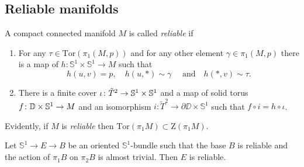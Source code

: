 \documentclass{amsart}
\begin{document}
\subsection{Reliable manifolds}

\begin{defn}
A compact connected manifold $M$ is called \emph{reliable} if 
\begin{enumerate}
\item \label{reliable1} For any 
$\tau\in \mathrm{Tor}(\pi_1(M,p))$ and for any other element $\gamma\in \pi_1(M,p)$ there is a map of $h\colon \mathbb{S}^1\times \mathbb{S}^1\to M$  such that 
$$h(u,v)= p,\quad
h(u,*)\sim\gamma\quad\text{ and}\quad
h(*,v)\sim\tau.$$
\item \label{reliable2} There is a finite cover $\iota\colon \tilde T^2\z\to \mathbb{S}^1\times \mathbb{S}^1$ and a map of solid torus $f\colon \DD\times \mathbb{S}^1\z\to M$ and an isomorphism $i\colon \tilde T^2\to \partial \DD\times \mathbb{S}^1$ such that $f\circ i=h\circ\iota$.
\end{enumerate}

\end{defn}

Evidently, if $M$ is \emph{reliable} then  $\mathrm{Tor}(\pi_1M)\subset \mathrm{Z}(\pi_1M)$.

\begin{claim}
 Let $\mathbb{S}^1\to E\to B$ be an oriented $\mathbb{S}^1$-bundle such that the base  $B$ is reliable and the action of $\pi_1B$ on $\pi_2B$ is almost trivial. 
Then $E$ is reliable.
\end{claim}
\end{document}
